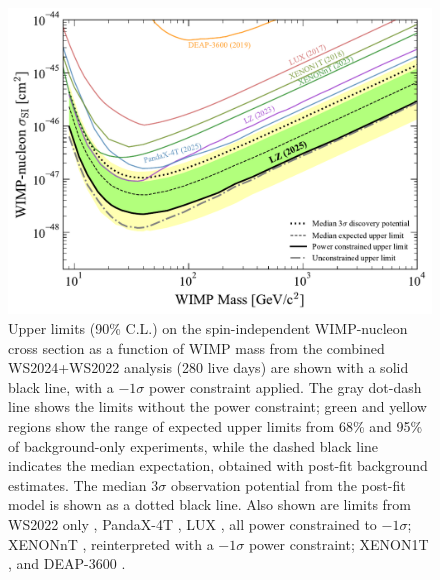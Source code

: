 \begin{figure}
    \centering
    \includegraphics[width=0.8\linewidth]{figures/WS2024Result/figure5.pdf}
    \caption{Upper limits (90\% C.L.) on the spin-independent WIMP-nucleon cross section as a function of WIMP mass from the combined WS2024+WS2022 analysis (280 live days) are shown with a solid black line, with a $-1\sigma$ power constraint applied. The gray dot-dash line shows the limits without the power constraint; green and yellow regions show the range of expected upper limits from 68\% and 95\% of background-only experiments, while the dashed black line indicates the median expectation, obtained with post-fit background estimates. The median $3\sigma$ observation potential from the post-fit model is shown as a dotted black line. Also shown are limits from WS2022 only \cite{LZ:2022lsv}, PandaX-4T \cite{PandaX-4T:2021bab}, LUX \cite{LUX:2016ggv}, all power constrained to $-1\sigma$; XENONnT \cite{XENONnTPres}, reinterpreted with a $-1\sigma$ power constraint; XENON1T \cite{XENON2018}, and DEAP-3600 \cite{DEAP:2019yzn}. \color{red}{Rewrite caption!}}
    \label{fig:WS2024Result/fig5}
\end{figure}